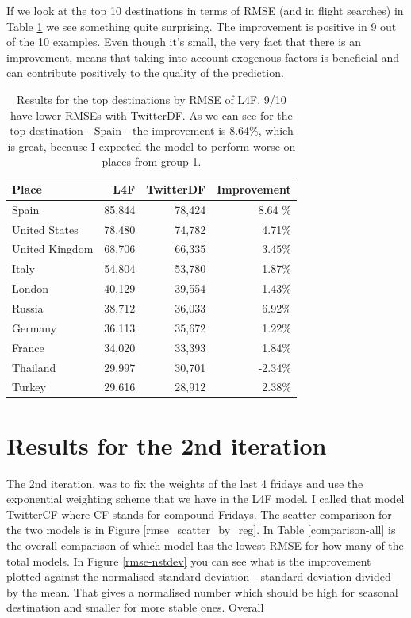 \documentclass[minf,frontabs,twoside,singlespacing,parskip]{infthesis}
\begin{document}
If we look at the top 10 destinations in terms of RMSE (and in flight searches) in Table \ref{top10} we see something quite surprising.  The improvement is positive in 9 out of the 10 examples. Even though it's small, the very fact that there is an improvement, means that taking into account exogenous factors is beneficial and can contribute positively to the quality of the prediction.

\begin{table}[]
\begin{center}
\begin{tabular}{ l | r | r | r}
Place & L4F & TwitterDF & Improvement \\
\hline
Spain & 85,844 & 78,424 & 8.64 \% \\
United States & 78,480 & 74,782 & 4.71\% \\
United Kingdom & 68,706 & 66,335 & 3.45\% \\
Italy & 54,804 & 53,780 & 1.87\% \\
London & 40,129 & 39,554 & 1.43\% \\
Russia & 38,712 & 36,033 & 6.92\% \\
Germany & 36,113 & 35,672 & 1.22\% \\
France & 34,020 & 33,393 & 1.84\% \\
Thailand & 29,997 & 30,701 & -2.34\% \\
Turkey & 29,616 & 28,912 & 2.38\% 
\end{tabular}
\end{center}
\caption{Results for the top destinations by RMSE of L4F. 9/10 have lower RMSEs with TwitterDF. As we can see for the top destination - Spain - the improvement is 8.64\%, which is great, because I expected the model to perform worse on places from group 1.}
\label{top10}
\end{table}


\newpage
\section{Results for the 2nd iteration}
\label{TwitterCF}

The 2nd iteration, was to fix the weights of the last 4 fridays and use the exponential weighting scheme that we have in the L4F model. I called that model TwitterCF where CF stands for compound Fridays. The scatter comparison for the two models is in Figure \ref{rmse_scatter_by_reg}. In Table \ref{comparison-all} is the overall comparison of which model has the lowest RMSE for how many of the total models.  In Figure \ref{rmse-nstdev} you can see what is the improvement plotted against the normalised standard deviation - standard deviation divided by the mean. That gives a normalised number which should be high for seasonal destination and smaller for more stable ones. Overall 
\end{document}
